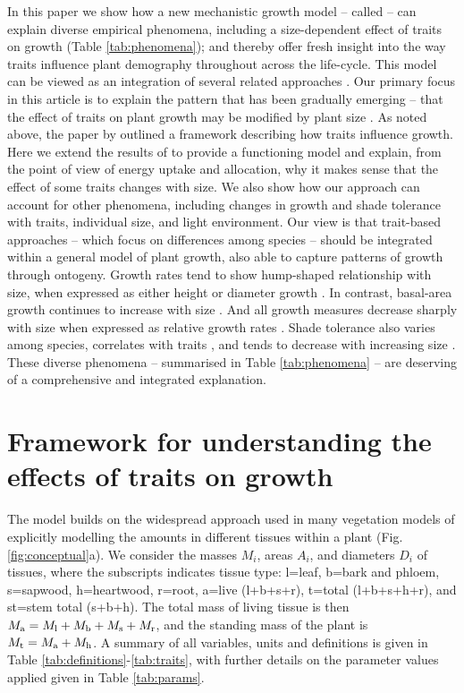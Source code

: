 \documentclass[a4paper,11pt]{article}
\begin{document}
In this paper we show how a new mechanistic growth model -- called {\plant} \citep{Falster-2016} -- can explain diverse empirical phenomena, including a size-dependent effect of traits on growth (Table \ref{tab:phenomena}); and thereby offer fresh insight into the way traits influence plant demography throughout across the life-cycle. This model can be viewed as an integration of several related approaches \citep[e.g.][]{Givnish-1988, Yokozawa-1995,Makela-1997, Moorcroft-2001, Sitch-2008, Falster-2011, King-2011}. Our primary focus in this article is to explain the pattern that has been gradually emerging -- that the effect of traits on plant growth may be modified by plant size \citep{Ruger-2012, Iida-2014, Gibert-2016}. As noted above, the paper by \citet{Gibert-2016} outlined a framework describing how traits influence growth. Here we extend the results of \citet{Gibert-2016} to provide a functioning model and explain, from the point of view of energy uptake and allocation, why it makes sense that the effect of some traits changes with size. We also show how our approach can account for other phenomena, including changes in growth and shade tolerance with traits, individual size, and light environment. Our view is that trait-based approaches -- which focus on differences among species -- should be integrated within a general model of plant growth, also able to capture patterns of growth through ontogeny. Growth rates tend to show hump-shaped relationship with size, when expressed as either height \citep{Sillett-2010, King-2011} or diameter growth \citep{Herault-2011}. In contrast, basal-area growth continues to increase with size \citep{Sillett-2010, Stephenson-2014}. And all growth measures decrease sharply with size when expressed as relative growth rates \citep{Rees-2010, Iida-2014}. Shade tolerance also varies among species, correlates with traits \citep{Lusk-2008,Poorter-2006}, and tends to decrease with increasing size \citep{Givnish-1988, Lusk-2008}. These diverse phenomena -- summarised in Table \ref{tab:phenomena} -- are deserving of a comprehensive and integrated explanation.

\section{Framework for understanding the effects of traits on growth}

The {\plant} model builds on the widespread approach used in many vegetation models of explicitly modelling the amounts in different tissues within a plant \citep[e.g.][]{Givnish-1988, Makela-1997, Moorcroft-2001, Sitch-2008, Falster-2011, King-2011, DeKauwe-2014} (Fig. \ref{fig:conceptual}a). We consider the masses $M_i$, areas $A_i$, and diameters $D_i$ of tissues, where the subscripts indicates tissue type: l=leaf, b=bark and phloem, s=sapwood, h=heartwood, r=root, a=live (l+b+s+r), t=total (l+b+s+h+r), and st=stem total (s+b+h). The total mass of living tissue is then $M_{\rm a}=M_{\rm l}+M_{\rm b}+M_{\rm s}+M_{\rm r}$, and the standing mass of the plant is $M_{\rm t}=M_{\rm a}+M_{\rm h}$. A summary of all variables, units and definitions is given in Table \ref{tab:definitions}-\ref{tab:traits}, with further details on the parameter values applied given in Table \ref{tab:params}.
\end{document}
